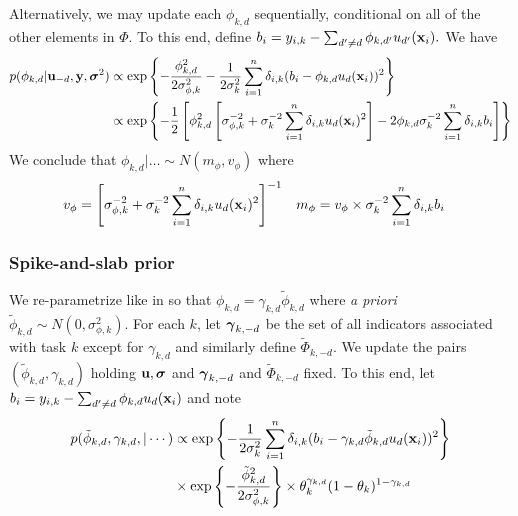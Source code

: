 \documentclass[12pt]{article}
\begin{document}
Alternatively, we may update each $\phi_{k,d}$ sequentially, conditional on all of the other elements in $\Phi.$
To this end, define $b_{i} = y_{i,k} - \sum_{d' \neq d}{\phi_{k,d'}u_{d'}(\mathbf{x}_{i})}.$
We have
\begin{align*}
p(\phi_{k,d} | \mathbf{u}_{-d}, \mathbf{y}, \boldsymbol{\sigma}^{2}) &\propto \exp\left\{-\frac{\phi_{k,d}^{2}}{2\sigma^{2}_{\phi,k}} - \frac{1}{2\sigma^{2}_{k}}\sum_{i = 1}^{n}{\delta_{i,k}(b_{i} - \phi_{k,d}u_{d}(\mathbf{x}_{i}))^{2}}\right\} \\
~&\propto \exp\left\{-\frac{1}{2}\left[\phi_{k,d}^{2}\left[\sigma^{-2}_{\phi,k} + \sigma^{-2}_{k}\sum_{i = 1}^{n}{\delta_{i,k}u_{d}(\mathbf{x}_{i})^{2}}\right] - 2\phi_{k,d}\sigma^{-2}_{k}\sum_{i = 1}^{n}{\delta_{i,k}b_{i}}\right]\right\}
\end{align*}
We conclude that $\phi_{k,d} | \ldots \sim N(m_{\phi}, v_{\phi})$ where 
\begin{align*}
v_{\phi} &= \left[\sigma^{-2}_{\phi,k} + \sigma^{-2}_{k}\sum_{i = 1}^{n}{\delta_{i,k}u_{d}(\mathbf{x}_{i})^{2}}\right]^{-1} & 
m_{\phi} &= v_{\phi} \times \sigma^{-2}_{k}\sum_{i = 1}^{n}{\delta_{i,k}b_{i}}
\end{align*}


\subsubsection{Spike-and-slab prior}

We re-parametrize like in \citet{Titsias2011} so that $\phi_{k,d} = \gamma_{k,d}\tilde{\phi}_{k,d}$ where \textit{a priori} $\tilde{\phi}_{k,d} \sim N(0,\sigma^{2}_{\phi,k}).$
For each $k$, let $\boldsymbol{\gamma}_{k,-d}$ be the set of all indicators associated with task $k$ except for $\gamma_{k,d}$ and similarly define $\tilde{\Phi}_{k,-d}.$
We update the pairs $(\tilde{\phi}_{k,d}, \gamma_{k,d})$ holding $\mathbf{u}, \boldsymbol{\sigma}$ and $\boldsymbol{\gamma}_{k,-d}$ and $\tilde{\Phi}_{k,-d}$ fixed.
To this end, let $b_{i} = y_{i,k} - \sum_{d' \neq d}{\phi_{k,d}u_{d}(\mathbf{x}_{i})}$ and note
\begin{align*}
p(\tilde{\phi}_{k,d}, \gamma_{k,d},| \cdots) &\propto \exp\left\{-\frac{1}{2\sigma^{2}_{k}}\sum_{i = 1}^{n}{\delta_{i,k}(b_{i} - \gamma_{k,d}\tilde{\phi}_{k,d}u_{d}(\mathbf{x}_{i}))^{2}} \right\} \\
&\times \exp\left\{-\frac{\tilde{\phi}^{2}_{k,d}}{2\sigma^{2}_{\phi,k}} \right\} \times \theta_{k}^{\gamma_{k,d}}(1 - \theta_{k})^{1 - \gamma_{k,d}}
\end{align*}
\end{document}
